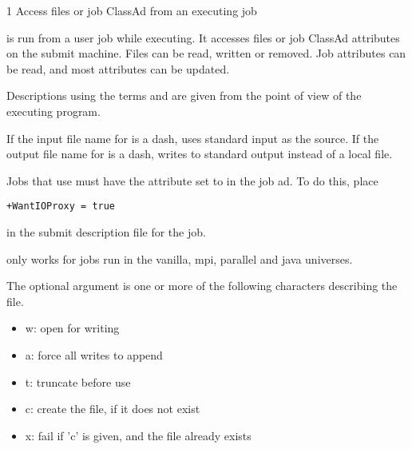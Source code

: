 \begin{ManPage}{\label{man-condor-chirp}}{1}
{Access files or job ClassAd from an executing job}
\Synopsis
{}

  

    

 

 

  

\Description 
{}
 is run from a user job while executing.
It accesses files or job ClassAd attributes on the submit machine.
Files can be read, written or removed.
Job attributes can be read, and most attributes can be updated.

Descriptions using the terms  and 
are given from the point of view of the executing program.

If the input file name for  is a dash,
 uses standard input as the source.
If the output file name for  is a dash,
 writes to standard output instead of a local file.

Jobs that use  must have the attribute
 set to  in the job ad.
To do this, place
\begin{verbatim}
+WantIOProxy = true
\end{verbatim}
in the submit description file for the job.

 only works for jobs run in the
vanilla, mpi, parallel and java universes.

The optional  argument
is one or more of the following characters describing the
 file.
  \begin{itemize}
    \item{w:  open for writing}
    \item{a:  force all writes to append}
    \item{t:  truncate before use}
    \item{c:  create the file, if it does not exist}
    \item{x:  fail if 'c' is given, and the file already exists}
  \end{itemize}


\end{ManPage}
